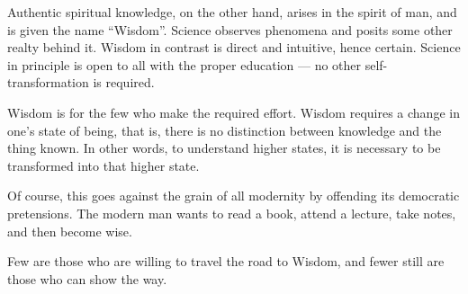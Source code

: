 Authentic spiritual knowledge, on the other hand, arises in the spirit of man, and is given the name ``Wisdom''. Science observes phenomena and posits some other realty behind it. Wisdom in contrast is direct and intuitive, hence certain. Science in principle is open to all with the proper education --- no other self-transformation is required.

Wisdom is for the few who make the required effort. Wisdom requires a change in one's state of being, that is, there is no distinction between knowledge and the thing known. In other words, to understand higher states, it is necessary to be transformed into that higher state.

Of course, this goes against the grain of all modernity by offending its democratic pretensions. The modern man wants to read a book, attend a lecture, take notes, and then become wise.

Few are those who are willing to travel the road to Wisdom, and fewer still are those who can show the way.



